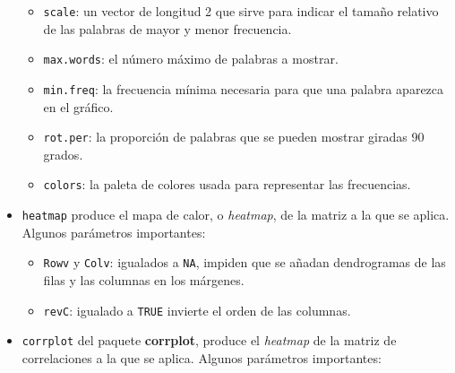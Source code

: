 \documentclass[
]{book}
\theoremstyle{definition}
\theoremstyle{definition}
\theoremstyle{definition}
\theoremstyle{remark}
\begin{document}
\begin{itemize}
  \begin{itemize}
  \item
    \texttt{scale}: un vector de longitud 2 que sirve para indicar el tamaño relativo de las palabras de mayor y menor frecuencia.
  \item
    \texttt{max.words}: el número máximo de palabras a mostrar.
  \item
    \texttt{min.freq}: la frecuencia mínima necesaria para que una palabra aparezca en el gráfico.
  \item
    \texttt{rot.per}: la proporción de palabras que se pueden mostrar giradas 90 grados.
  \item
    \texttt{colors}: la paleta de colores usada para representar las frecuencias.
  \end{itemize}
\item
  \texttt{heatmap} produce el mapa de calor, o \emph{heatmap}, de la matriz a la que se aplica. Algunos parámetros importantes:

  \begin{itemize}
  \item
    \texttt{Rowv} y \texttt{Colv}: igualados a \texttt{NA}, impiden que se añadan dendrogramas de las filas y las columnas en los márgenes.
  \item
    \texttt{revC}: igualado a \texttt{TRUE} invierte el orden de las columnas.
  \end{itemize}
\item
  \texttt{corrplot} del paquete \textbf{corrplot}, produce el \emph{heatmap} de la matriz de correlaciones a la que se aplica. Algunos parámetros importantes:


\end{itemize}
\end{document}
